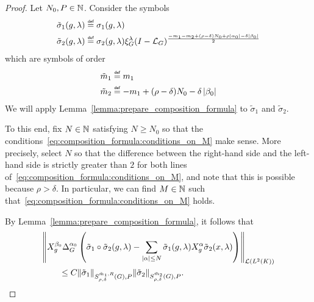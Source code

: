 \begin{proof}
    Let $N_0, P \in \mathbb{N}$.
    Consider the symbols
    \begin{align*}
        \tilde \sigma_1(g, \lambda) &\defeq \sigma_1(g, \lambda)\\
        \tilde \sigma_2(g, \lambda) &\defeq \sigma_2(g, \lambda) \Rep \lambda \BesselPotential {-m_1 - m_2 + (\rho - \delta) N_0 + \rho \abs {\alpha_0} - \delta \abs {\beta_0}}\\
    \end{align*}
    which are symbols of order
    \begin{align*}
        \tilde m_1 &\defeq m_1\\
        \tilde m_2 &\defeq -m_1 + (\rho - \delta) N_0 - \delta \abs {\beta_0}
    \end{align*}
    We will apply Lemma~\ref{lemma:prepare_composition_formula} to $\tilde \sigma_1$ and $\tilde \sigma_2$.

    To this end,
    fix $N \in \mathbb{N}$ satisfying $N \geq N_0$ so that the conditions~\eqref{eq:composition_formula:conditions_on_M} make sense.
    More precisely,
    select $N$ so that the difference between the right-hand side and the left-hand side is strictly greater than $2$ for both lines of~\eqref{eq:composition_formula:conditions_on_M},
    and note that this is possible because $\rho > \delta$.
    In particular,
    we can find $M \in \mathbb{N}$ such that~\eqref{eq:composition_formula:conditions_on_M} holds.

    By Lemma~\ref{lemma:prepare_composition_formula},
    it follows that
    \begin{align*}
        &\norm [\Lin {\Lebesgue 2 \CompactGroup}] {%
        \LeftDifferentialOperator [g] {\beta_0}
        \DifferenceOperatorOrder {\alpha_0}
        \left(
                \tilde \sigma_1 \circ \tilde \sigma_2(g, \lambda)
                - \sum_{\abs \alpha \leq N} \tilde \sigma_1(g, \lambda) \LeftDifferentialOperator [g] \alpha \tilde \sigma_2(x, \lambda)
            \right)
        }\\
        &\qquad \leq C \SymbolSemiNorm {\tilde m_1, R} {\rho, \delta} P {\tilde \sigma_1} \SymbolSemiNorm {\tilde m_2} {\rho, \delta} P {\tilde \sigma_2}.
    \end{align*}


\end{proof}
